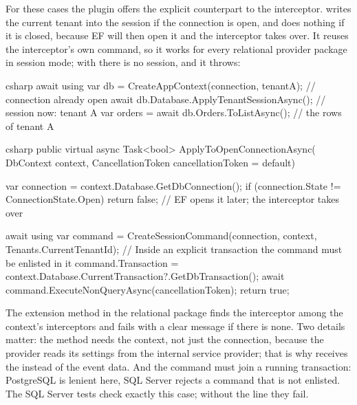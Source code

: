 For these cases the plugin offers the explicit counterpart to the interceptor.
writes the current tenant into the session if the connection is open, and does nothing if it
is closed, because EF will then open it and the interceptor takes over. It reuses the
interceptor's own command, so it works for every relational provider package in session mode;
with  there is no session,
and it throws:

\begin{sourcecode}[Usage]{csharp}
await using var db = CreateAppContext(connection, tenantA);   // connection already open
await db.Database.ApplyTenantSessionAsync();                  // session now: tenant A
var orders = await db.Orders.ToListAsync();                   // the rows of tenant A
\end{sourcecode}

\begin{sourcecode}{csharp}
public virtual async Task<bool> ApplyToOpenConnectionAsync(
    DbContext context, CancellationToken cancellationToken = default)
{
    var connection = context.Database.GetDbConnection();
    if (connection.State != ConnectionState.Open)
        return false;                     // EF opens it later; the interceptor takes over

    await using var command =
        CreateSessionCommand(connection, context, Tenants.CurrentTenantId);
    // Inside an explicit transaction the command must be enlisted in it
    command.Transaction = context.Database.CurrentTransaction?.GetDbTransaction();
    await command.ExecuteNonQueryAsync(cancellationToken);
    return true;
}
\end{sourcecode}

The extension method  in the relational package
finds the interceptor among the context's interceptors and fails with a clear message if
there is none. Two details matter: the method needs the context, not just the connection,
because the provider reads its settings from the internal service provider; that is why
 receives the
 instead of the event data. And the command must join a running
transaction: PostgreSQL is lenient here, SQL Server rejects a command that is not enlisted.
The SQL Server tests check exactly this case; without the line they fail.

